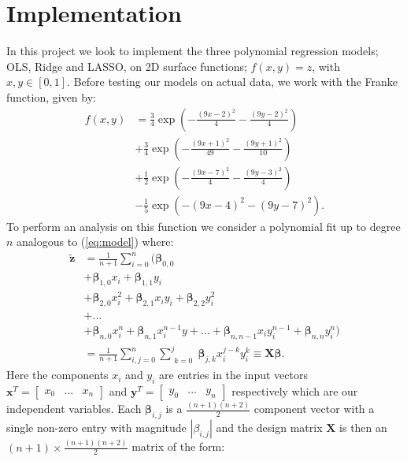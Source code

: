 \documentclass[%
reprint,
amsmath,amssymb,
aps,
pra,
]{revtex4-2}
\newcommand{\f}[2]{\frac{#1}{#2}}
\begin{document}
\section{Implementation}
In this project we look to implement the three polynomial regression models; OLS, Ridge and  LASSO, on 2D surface functions; \(f(x,y)=z\), with \(x,y\in[0,1]\). Before testing our models on actual data, we work with the Franke function, given by:
\begin{align}	\label{eq:franke}
	f(x,y)&=\frac{3}{4}\exp(-\frac{(9x-2)^2}{4}-\frac{(9y-2)^2}{4})\nonumber\\
	&+\frac{3}{4}\exp(-\frac{(9x+1)^2}{49}-\frac{(9y+1)^2}{10})\nonumber\\
	&+\frac{1}{2}\exp(-\frac{(9x-7)^2}{4}-\frac{(9y-3)^2}{4})\nonumber\\
	&-\frac{1}{5}\exp(-(9x-4)^2-(9y-7)^2).
\end{align}
To perform an analysis on this function we consider a polynomial fit up to degree $n$ analogous to (\ref{eq:model}) where:
\begin{align}
	\tilde{\bm{z}}&=\f1{n+1}\sum_{i=0}^{n}\bigg(\bm\beta_{0,0}\nonumber\\
	&+\bm\beta_{1,0}x_i+\bm\beta_{1,1}y_i\nonumber\\
	&+\bm\beta_{2,0}x_i^2+\bm\beta_{2,1}x_iy_i+\bm\beta_{2,2}y_i^2\nonumber\\
	&+...\nonumber\\
	&+\bm\beta_{n,0}x_i^n+\bm\beta_{n,1}x_i^{n-1}y+...+\bm\beta_{n,n-1}x_iy_i^{n-1}+\bm\beta_{n,n}y_i^n\bigg)\nonumber\\
	&=\frac{1}{n+1}\sum_{i,j=0}^{n}\sum_{\substack{k=0}}^{j}\bm\beta_{j,k} x^{j-k}_i y^{k}_i\equiv \bm X\bm\beta.
	\label{eq:bmz}
\end{align}
Here the components $x_i$ and $y_i$ are entries in the input vectors $\bm x^T=\begin{bmatrix} x_0&...&x_n \end{bmatrix}$ and $\bm y^T=\begin{bmatrix} y_0& ...&y_n \end{bmatrix}$ respectively which are our independent variables. Each $\bm\beta_{i,j}$ is a $\frac{(n+1)(n+2)}{2}$ component vector with a single non-zero entry with magnitude $|\beta_{i,j}|$ and the design matrix $\bm X$ is then an $(n+1)\times\frac{(n+1)(n+2)}{2}$ matrix of the form:
\end{document}
